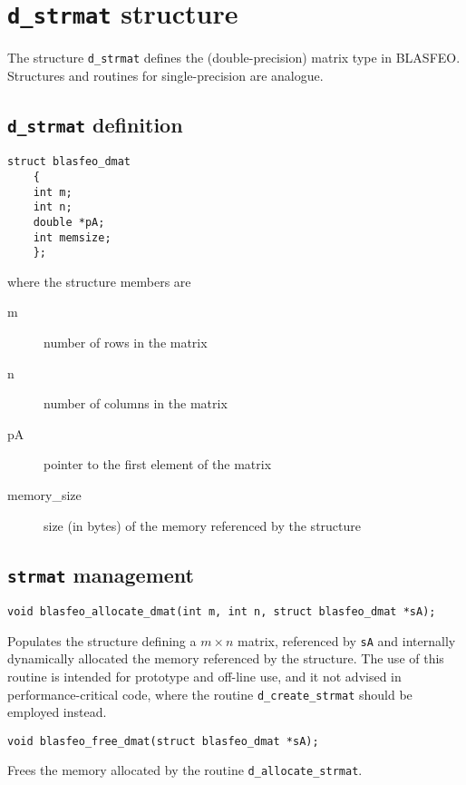\documentclass[a4paper]{report}
\begin{document}
\section{{\tt d\_strmat} structure}

The structure {\tt d\_strmat} defines the (double-precision) matrix type in BLASFEO.
Structures and routines for single-precision are analogue.



\subsection{{\tt d\_strmat} definition}

\begin{verbatim}
struct blasfeo_dmat 
    {
    int m;
    int n;
    double *pA;
    int memsize;
    };
\end{verbatim}
where the structure members are
\begin{description}
\item[m] number of rows in the matrix
\item[n] number of columns in the matrix
\item[pA] pointer to the first element of the matrix
\item[memory\_size] size (in bytes) of the memory referenced by the structure
\end{description}



\subsection{{\tt strmat} management}

\begin{verbatim}
void blasfeo_allocate_dmat(int m, int n, struct blasfeo_dmat *sA);
\end{verbatim}
Populates the structure defining a $m\times n$ matrix, referenced by {\tt sA} and internally dynamically allocated the memory referenced by the structure.
The use of this routine is intended for prototype and off-line use, and it not advised in performance-critical code, where the routine {\tt d\_create\_strmat} should be employed instead.

\begin{verbatim}
void blasfeo_free_dmat(struct blasfeo_dmat *sA);
\end{verbatim}
Frees the memory allocated by the routine {\tt d\_allocate\_strmat}.
\end{document}
